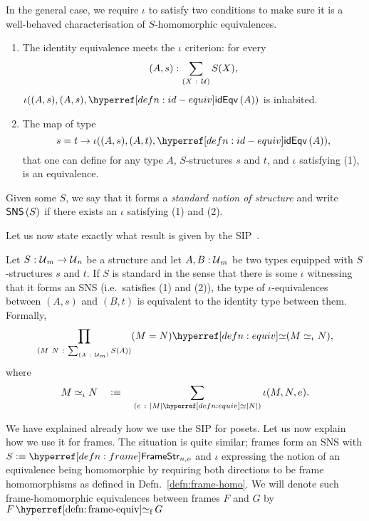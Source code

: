 In the general case, we require $\iota$ to satisfy two conditions to make sure it is a
well-behaved characterisation of $S$-homomorphic equivalences.
\begin{enumerate}
  \item The identity equivalence meets the $\iota$ criterion: for every $$(A,
    s)\hspace{0.1mm}:\hspace{0.1mm}\sum_{(X~:~\mathcal{U}{})} S(X),$$ $\iota((A, s), (A, s), \idequiv{A})$ is inhabited.
  \item The map of type
    \begin{equation*}
      s = t \rightarrow \iota((A, s), (A, t), \idequiv{A}),
    \end{equation*}
    that one can define for any type $A$, $S$-structures $s$ and $t$, and $\iota$ satisfying
    (1), is an equivalence.
\end{enumerate}

Given some $S$, we say that it forms a \emph{standard notion of structure} and write
$\mathsf{SNS}\left(S\right)$ if there exists an $\iota$ satisfying (1) and (2).

Let us now state exactly what result is given by the
SIP~\cite{escardo-uf-intro, agda-cubical}.
\begin{defn}
  Let $S\hspace{0.1mm}:\hspace{0.1mm}\mathcal{U}{}_m \rightarrow \mathcal{U}{}_n$ be a structure and let $A, B:\mathcal{U}{}_m$
  be two types equipped with $S$-structures $s$ and $t$. If $S$ is standard in the sense
  that there is some $\iota$ witnessing that it forms an SNS (i.e.~satisfies (1) and (2)), the
  type of $\iota$-equivalences between $(A, s)$ and $(B, t)$ is equivalent to the identity
  type between them. Formally,
  \begin{equation*}
    \pity{M~N}{\sigmaty{A}{\univ{}_m}{S(A)}}{\typequiv{(M = N)}{(M \simeq_{\iota} N)}},
  \end{equation*}
  where
  \begin{equation*}
    M \simeq_{\iota} N \quad\is\quad \sigmaty{e}{\typequiv{\abs{M}}{\abs{N}}}{\iota(M, N, e)}.
  \end{equation*}
\end{defn}

We have explained already how we use the SIP for posets. Let us now explain how we use it
for frames. The situation is quite similar; frames form an SNS with $S \is
\framestrnm{}_{n, o}$ and $\iota$ expressing the notion of an equivalence being homomorphic by
requiring both directions to be frame homomorphisms as defined in
Defn.~\ref{defn:frame-homo}. We will denote such frame-homomorphic equivalences between
frames $F$ and $G$ by $\frameequiv{F}{G}$

